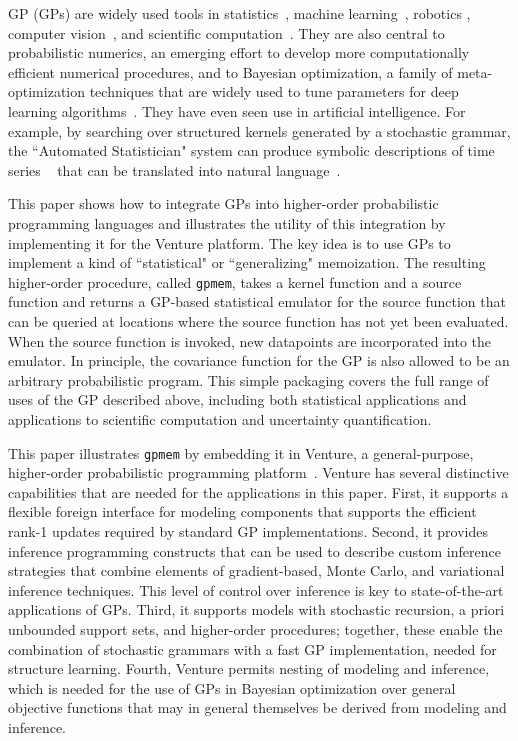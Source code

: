 \acl{GP} (GPs)  are widely used tools in statistics~\citep{barry1986nonparametric}, machine learning~\citep{neal1995bayesian,williams1998bayesian,kuss2005assessing,rasmussen2006gaussian,damianou2013deep}, robotics \citep{ferris2006gaussian}, computer vision~\citep{kemmler2013one}, and scientific computation~\citep{kennedy2001bayesian,schneider2008simulations,kwan2013cosmic}.
They are also central to probabilistic numerics, an emerging effort to develop more computationally efficient numerical procedures, and to Bayesian optimization, a family of meta-optimization techniques that are widely used to tune parameters for deep learning algorithms~\citep{snoek2012practical,gelbart2014bayesian}. 
They have even seen use in artificial intelligence. For example, by searching
over structured kernels generated by a stochastic grammar, the ``Automated
Statistician" system can produce symbolic descriptions of time series
~\citep{duvenaud2013structure} that can be translated into natural
language~\citep{lloyd2014automatic}.



This paper shows how to integrate \acsp{GP} into higher-order
probabilistic programming languages and illustrates the utility of this
integration by implementing it for the Venture platform. The key idea is to use
GPs to implement a kind of ``statistical" or ``generalizing" memoization. The
resulting higher-order procedure, called {\tt gpmem}, takes a kernel function
and a source function and returns a GP-based statistical emulator for the source
function that can be queried at locations where the source function has not yet
been evaluated. When the source function is invoked, new datapoints are
incorporated into the emulator. In principle, the covariance function for the
GP is also allowed to be an arbitrary probabilistic program. This simple packaging covers the full range of uses of the GP described above, including both statistical applications and applications to scientific computation and uncertainty quantification.

This paper illustrates {\tt gpmem} by embedding it in Venture, a general-purpose, higher-order probabilistic programming platform~\citep{mansinghka2014venture}. Venture has several distinctive capabilities that are needed for the applications in this paper. First, it supports a flexible foreign interface for modeling components that supports the efficient rank-1 updates required by standard GP implementations. Second, it provides inference programming constructs that can be used to describe custom inference strategies that combine elements of gradient-based, Monte Carlo, and variational inference techniques. This level of control over inference is key to state-of-the-art applications of GPs. Third, it supports models with stochastic recursion, a priori unbounded support sets, and higher-order procedures; together, these enable the combination of stochastic grammars with a fast GP implementation, needed for structure learning. Fourth, Venture permits nesting of modeling and inference, which is needed for the use of GPs in Bayesian optimization over general objective functions that may in general themselves be derived from modeling and inference.

